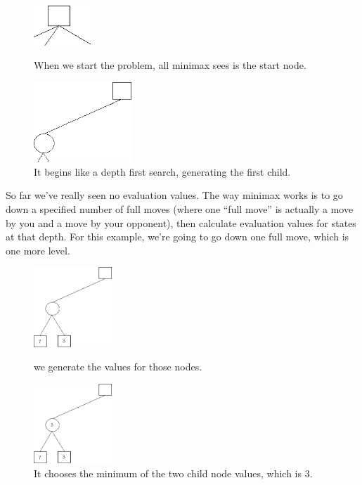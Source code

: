 \begin{figure}[H]
\centering
	\begin{minipage}[b]{0.45\linewidth}
		\centering
		\includegraphics[height=1.5cm]{2_State_of_the_art/Arimaa_on_MCTS_Benoit/img/minimax2.png}
		\caption{\label{fig:minimax2}When we start the problem, all minimax sees is the start node.}
	\end{minipage}%
	\hspace*{1cm}
	\begin{minipage}[b]{0.45\linewidth}
		\centering
		\includegraphics[height=3cm]{2_State_of_the_art/Arimaa_on_MCTS_Benoit/img/minimax3.png}
		\caption{\label{fig:minimax3}It begins like a depth first search, generating the first child.}
	\end{minipage}%
\end{figure}

\noindent
So far we've really seen no evaluation values. The way minimax works is to go down a specified number of full moves (where one ``full move'' is actually a move by you and a move by your opponent), then calculate evaluation values for states at that depth. For this example, we're going to go down one full move, which is one more level. 
\begin{figure}[H]
\centering
	\begin{minipage}[b]{0.45\linewidth}
		\centering
		\includegraphics[height=3cm]{2_State_of_the_art/Arimaa_on_MCTS_Benoit/img/minimax4.png}
		\caption{\label{fig:minimax4}we generate the values for those nodes.}
	\end{minipage}%
	\hspace*{1cm}
	\begin{minipage}[b]{0.45\linewidth}
		\centering
		\includegraphics[height=3cm]{2_State_of_the_art/Arimaa_on_MCTS_Benoit/img/minimax5.png}
		\caption{\label{fig:minimax5}It chooses the minimum of the two child node values, which is 3.}
	\end{minipage}%
\end{figure}


